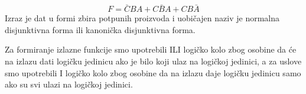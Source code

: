 \begin{frame}[label=02-s014]
\[
F=\bar CBA+C\bar BA+CB\bar A
\]
Izraz je dat u formi \alert{zbira potpunih proizvoda} i uobičajen naziv je \alert{normalna disjunktivna forma} ili \alert{kanonička disjunktivna forma}.

Za formiranje izlazne funkcije smo upotrebili ILI logičko kolo zbog osobine da će na izlazu dati logičku jedinicu ako je bilo koji ulaz na logičkoj jedinici, a za uslove smo upotrebili I logičko kolo zbog osobine da na izlazu daje logičku jedinicu samo ako su svi ulazi na logičkoj jedinici.
\end{frame}
